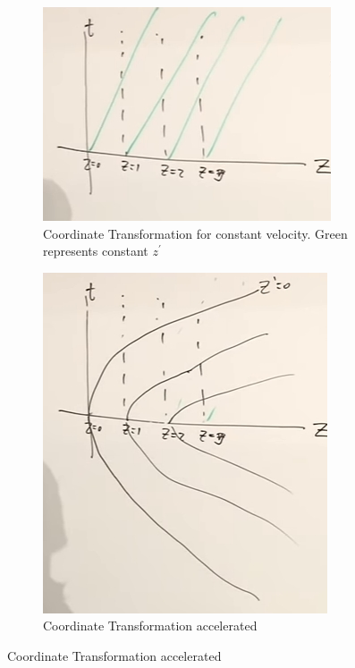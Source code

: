 \documentclass[]{article}
\begin{document}
\begin{figure}[H]
	\begin{center}
		\caption{Coordinate Transformation for constant velocity versus accelerated}
		\begin{subfigure}[t]{0.45\textwidth}
			\caption{Coordinate Transformation for constant velocity. Green represents 	constant $z^\prime$}\label{fig:gr-1-coordinates-const}
			\includegraphics[width=\textwidth]{gr-1-coordinates-const}
		\end{subfigure}
		\;
		\begin{subfigure}[t]{0.4\textwidth}
			\caption{Coordinate Transformation 		accelerated}\label{fig:gr-1-coordinates-accelerated}
			\includegraphics[width=\textwidth]{gr-1-coordinates-accelerated}
		\end{subfigure}
	\end{center}
\end{figure}
\end{document}

